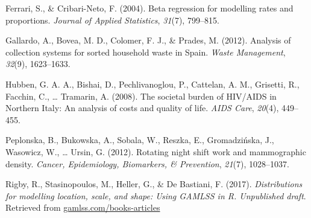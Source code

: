 \documentclass[english,man]{apa6}
\theoremstyle{definition}
\theoremstyle{definition}
\theoremstyle{remark}
\begin{document}
\hypertarget{ref-ferrari2004beta}{}
Ferrari, S., \& Cribari-Neto, F. (2004). Beta regression for modelling
rates and proportions. \emph{Journal of Applied Statistics},
\emph{31}(7), 799--815.

\hypertarget{ref-gallardo2012analysis}{}
Gallardo, A., Bovea, M. D., Colomer, F. J., \& Prades, M. (2012).
Analysis of collection systems for sorted household waste in Spain.
\emph{Waste Management}, \emph{32}(9), 1623--1633.

\hypertarget{ref-hubben2008societal}{}
Hubben, G. A. A., Bishai, D., Pechlivanoglou, P., Cattelan, A. M.,
Grisetti, R., Facchin, C., \ldots{} Tramarin, A. (2008). The societal
burden of HIV/AIDS in Northern Italy: An analysis of costs and quality
of life. \emph{AIDS Care}, \emph{20}(4), 449--455.

\hypertarget{ref-peplonska2012rotating}{}
Peplonska, B., Bukowska, A., Sobala, W., Reszka, E., Gromadzińska, J.,
Wasowicz, W., \ldots{} Ursin, G. (2012). Rotating night shift work and
mammographic density. \emph{Cancer, Epidemiology, Biomarkers, \&
Prevention}, \emph{21}(7), 1028--1037.

\hypertarget{ref-rigby2017distributions}{}
Rigby, R., Stasinopoulos, M., Heller, G., \& De Bastiani, F. (2017).
\emph{Distributions for modelling location, scale, and shape: Using
GAMLSS in R. Unpublished draft}. Retrieved from
\url{gamlss.com/books-articles}
\end{document}
